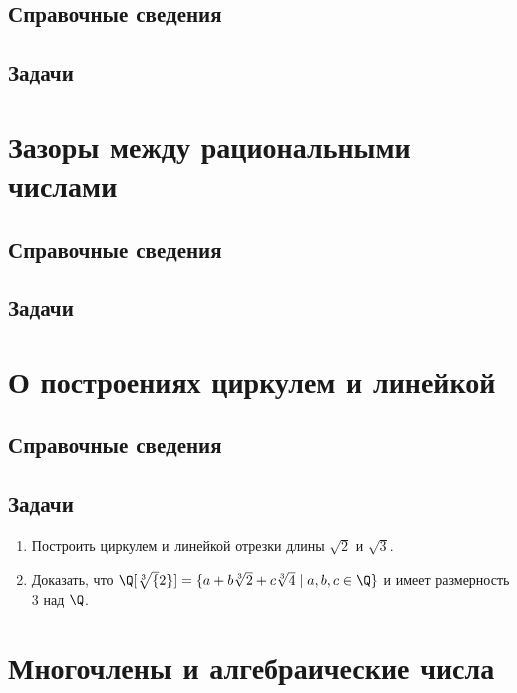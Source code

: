 \subsection*{Справочные сведения}

\subsection*{Задачи}



\section{Зазоры между рациональными числами}

\subsection*{Справочные сведения}

\subsection*{Задачи}



\section{О построениях циркулем и линейкой}

\subsection*{Справочные сведения}

\subsection*{Задачи}

\begin{enumerate}
\item Построить циркулем и линейкой отрезки длины $\sqrt 2$ и $\sqrt 3$.
\item Доказать, что $\Q[\sqrt[3]{2}]=\{a+b\sqrt[3]{2}+c\sqrt[3]{4}\;|\;a,b,c\in\Q\}$ и имеет размерность 3 над $\Q$.
\end{enumerate}





\section{Многочлены и алгебраические числа}

